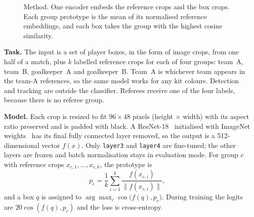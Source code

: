 \documentclass[10pt]{article}
\begin{document}
\begin{figure}[tbp]
\centering
{}
\caption{Method. One encoder embeds the reference crops and the box crops. Each group prototype is the mean of its normalised reference embeddings, and each box takes the group with the highest cosine similarity.}
\label{fig:method}
\end{figure}

\textbf{Task.} The input is a set of player boxes, in the form of image crops, from one half of a match, plus $k$ labelled reference crops for each of four groups: team~A, team~B, goalkeeper~A and goalkeeper~B. Team~A is whichever team appears in the team-A references, so the same model works for any kit colours. Detection and tracking are outside the classifier. Referees receive one of the four labels, because there is no referee group.

\textbf{Model.} Each crop is resized to fit $96\times48$ pixels (height $\times$ width) with its aspect ratio preserved and is padded with black. A ResNet-18~\cite{he2016resnet} initialised with ImageNet weights~\cite{russakovsky2014imagenet} has its final fully connected layer removed, so the output is a 512-dimensional vector $f(x)$. Only \texttt{layer3} and \texttt{layer4} are fine-tuned; the other layers are frozen and batch normalisation stays in evaluation mode. For group $c$ with reference crops $x_{c,1},\dots,x_{c,k}$, the prototype is
\begin{equation}
p_c=\frac{1}{k}\sum_{i=1}^{k}\frac{f(x_{c,i})}{\lVert f(x_{c,i})\rVert},
\end{equation}
and a box $q$ is assigned to $\arg\max_c \cos\big(f(q),p_c\big)$. During training the logits are $20\cos(f(q),p_c)$ and the loss is cross-entropy.
\end{document}
